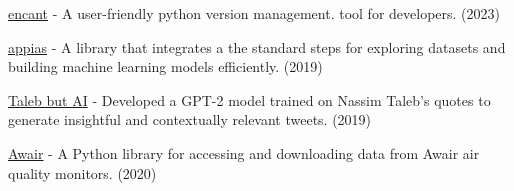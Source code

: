 \begin{cventries}
\vspace{-\baselineskip}

\cventry{}{}{}{}
{
    \begin{cvitems}
    \item \href{https://github.com/aglove2189/encant}{\faLink\acvHeaderIconSep encant}{ - A user-friendly python version management. tool for developers. (2023)}
    \item \href{https://github.com/aglove2189/appias}{\faLink\acvHeaderIconSep appias}{ - A library that integrates a the standard steps for exploring datasets and building machine learning models efficiently. (2019)}
    \item \href{https://twitter.com/taleb_gpt2}{\faTwitter\acvHeaderIconSep Taleb but AI}{ - Developed a GPT-2 model trained on Nassim Taleb's quotes to generate insightful and contextually relevant tweets. (2019)}
    \item \href{https://github.com/aglove2189/awair}{\faLink\acvHeaderIconSep Awair}{ - A Python library for accessing and downloading data from Awair air quality monitors. (2020)}
    \end{cvitems}
}

\end{cventries}